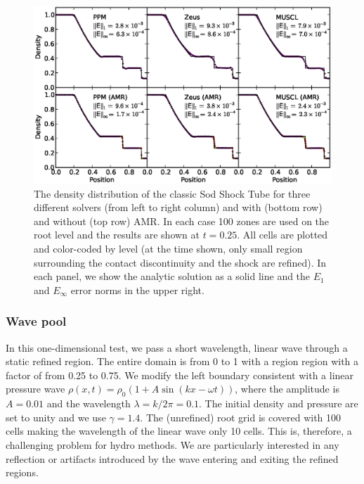 \begin{figure}
\begin{center}
\includegraphics[width=\textwidth]{figures/SodShockTube.eps}
\caption{The density distribution of the classic Sod Shock Tube for
three different solvers (from left to right column) and with (bottom
row) and without (top row) AMR.  In each case 100 zones are used on
the root level and the results are shown at $t=0.25$.  All cells are
plotted and color-coded by level (at the time shown, only small region
surrounding the contact discontinuity and the shock are refined).  In
each panel, we show the analytic solution as a solid line and the $E_1$
and $E_\infty$ error norms in the upper right.}
\label{fig.sodshocktube}
\end{center}
\end{figure}


\subsubsection{Wave pool}
\label{sec.tests.wavepool}

In this one-dimensional test, we pass a short wavelength, linear wave through a static refined region.  The entire domain is from 0 to 1 with a region region with a factor of from 0.25 to 0.75.  We modify the left boundary consistent with a linear pressure wave $\rho(x,t) = \rho_0 (1 + A \sin(kx - \omega t))$, where the amplitude is $A = 0.01$ and the wavelength $\lambda = k/2\pi = 0.1$.  The initial density and pressure are set to unity and we use $\gamma = 1.4$.  The (unrefined) root grid is covered with 100 cells making the wavelength of the linear wave only 10 cells.  This is, therefore, a challenging problem for hydro methods.  We are particularly interested in any reflection or artifacts introduced by the wave entering and exiting the refined regions.

